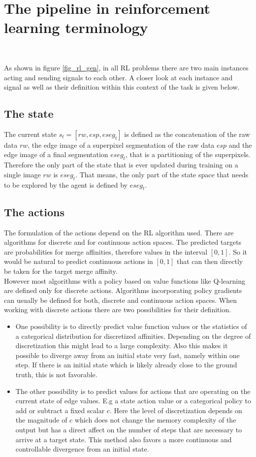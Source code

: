\section{The pipeline in reinforcement learning terminology}~\label{seg:pip_tl_term}

As shown in figure \ref{fig_rl_gen}, in all RL problems there are two main instances acting and sending signals to each other. A closer look at each instance and signal as well as their definition within this context of the task is given below. 

\subsection{The state}
The current state $s_t=\left[ rw, esp, eseg_t \right]$ is defined as the concatenation of the raw data $rw$, the edge image of a superpixel segmentation of the raw data $esp$ and the edge image of a final segmentation $eseg_t$, that is a partitioning of the superpixels. Therefore the only part of the state that is ever updated during training on a single image $rw$ is $eseg_t$. That means, the only part of the state space that needs to be explored by the agent is defined by $eseg_t$.
\subsection{The actions}
The formulation of the actions depend on the RL algorithm used. There are algorithms for discrete and for continuous action spaces. The predicted targets are probabilities for merge affinities, therefore values in the interval $[0, 1]$. So it would be natural to predict continuous actions in $[0, 1]$ that can then directly be taken for the target merge affinity.\\
However most algorithms with a policy based on value functions like Q-learning are defined only for discrete actions. Algorithms incorporating policy gradients can usually be defined for both, discrete and continuous action spaces. When working with discrete actions there are two possibilities for their definition. \\
\begin{itemize}
	\item One possibility is to directly predict value function values or the statistics of a categorical distribution for discretized affinities. Depending on the degree of discretization this might lead to a large complexity. Also this makes it possible to diverge away from an initial state very fast, namely within one step. If there is an initial state which is likely already close to the ground truth, this is not favorable.
	\item The other possibility is to predict values for actions that are operating on the current state of edge values. E.g a state action value or a categorical policy to add or subtract a fixed scalar $c$. Here the level of discretization depends on the magnitude of $c$ which does not change the memory complexity of the output but has a direct affect on the number of steps that are necessary to arrive at a target state. This method also favors a more continuous and controllable divergence from an initial state.
\end{itemize}

